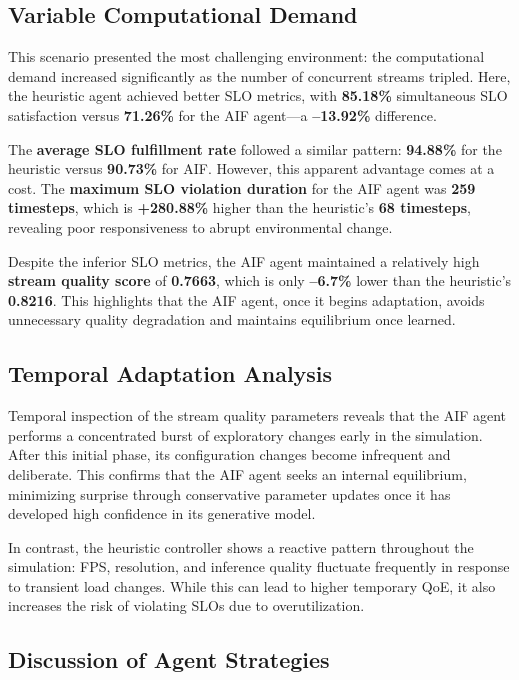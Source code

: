 {\subsection{Variable Computational Demand}

This scenario presented the most challenging environment: the computational demand increased significantly as the number of concurrent streams tripled. Here, the heuristic agent achieved better SLO metrics, with \textbf{85.18\%} simultaneous SLO satisfaction versus \textbf{71.26\%} for the AIF agent---a \textbf{--13.92\%} difference.

The \textbf{average SLO fulfillment rate} followed a similar pattern: \textbf{94.88\%} for the heuristic versus \textbf{90.73\%} for AIF. However, this apparent advantage comes at a cost. The \textbf{maximum SLO violation duration} for the AIF agent was \textbf{259 timesteps}, which is \textbf{+280.88\%} higher than the heuristic’s \textbf{68 timesteps}, revealing poor responsiveness to abrupt environmental change.

Despite the inferior SLO metrics, the AIF agent maintained a relatively high \textbf{stream quality score} of \textbf{0.7663}, which is only \textbf{--6.7\3\%} lower than the heuristic’s \textbf{0.8216}. This highlights that the AIF agent, once it begins adaptation, avoids unnecessary quality degradation and maintains equilibrium once learned.

\subsection{Temporal Adaptation Analysis}

Temporal inspection of the stream quality parameters reveals that the AIF agent performs a concentrated burst of exploratory changes early in the simulation. After this initial phase, its configuration changes become infrequent and deliberate. This confirms that the AIF agent seeks an internal equilibrium, minimizing surprise through conservative parameter updates once it has developed high confidence in its generative model.

In contrast, the heuristic controller shows a reactive pattern throughout the simulation: FPS, resolution, and inference quality fluctuate frequently in response to transient load changes. While this can lead to higher temporary QoE, it also increases the risk of violating SLOs due to overutilization.

\subsection{Discussion of Agent Strategies}

}

